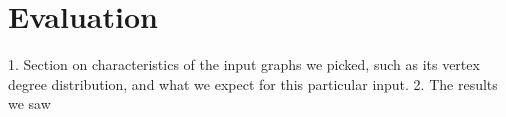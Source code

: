 \section{Evaluation}
\label{sec:eval}
1. Section on characteristics of the input graphs we picked, such as its vertex degree 
distribution, and what we expect for this particular input.
2. The results we saw
